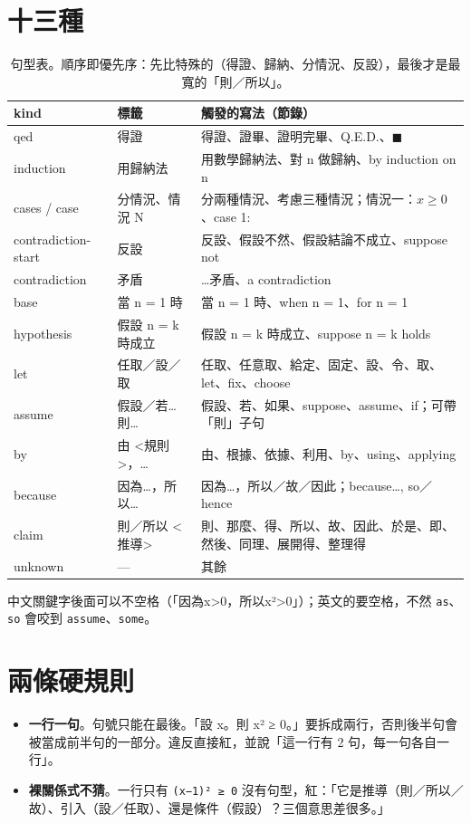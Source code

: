 \documentclass[11pt,a4paper,oneside]{book}
\renewcommand{\_}{\ifmmode\origunderscore\else\textunderscore\allowbreak\fi}
\newcommand{\code}[1]{\texttt{#1}}
\begin{document}
\section{十三種}
\begin{table}[h]
\centering\small\sffamily
\begin{tabularx}{\textwidth}{@{}llY@{}}
\toprule
kind & 標籤 & 觸發的寫法（節錄） \\
\midrule
qed & 得證 & 得證、證畢、證明完畢、Q.E.D.、$\blacksquare$ \\
induction & 用歸納法 & 用數學歸納法、對 n 做歸納、by induction on n \\
cases / case & 分情況、情況 N & 分兩種情況、考慮三種情況；情況一：$x \ge 0$、case 1: \\
contradiction-start & 反設 & 反設、假設不然、假設結論不成立、suppose not \\
contradiction & 矛盾 & …矛盾、a contradiction \\
base & 當 n = 1 時 & 當 n = 1 時、when n = 1、for n = 1 \\
hypothesis & 假設 n = k 時成立 & 假設 n = k 時成立、suppose n = k holds \\
let & 任取／設／取 & 任取、任意取、給定、固定、設、令、取、let、fix、choose \\
assume & 假設／若…則… & 假設、若、如果、suppose、assume、if；可帶「則」子句 \\
by & 由 <規則>，… & 由、根據、依據、利用、by、using、applying \\
because & 因為…，所以… & 因為…，所以／故／因此；because…, so／hence \\
claim & 則／所以 <推導> & 則、那麼、得、所以、故、因此、於是、即、然後、同理、展開得、整理得 \\
unknown & — & 其餘 \\
\bottomrule
\end{tabularx}
\caption{句型表。順序即優先序：先比特殊的（得證、歸納、分情況、反設），最後才是最寬的「則／所以」。}
\end{table}

中文關鍵字後面可以不空格（「因為x>0，所以x²>0」）；英文的要空格，不然 \code{as}、\code{so} 會咬到 \code{assume}、\code{some}。

\section{兩條硬規則}
\begin{itemize}
  \item \textbf{一行一句}。句號只能在最後。「設 x。則 x² ≥ 0。」要拆成兩行，否則後半句會被當成前半句的一部分。違反直接紅，並說「這一行有 2 句，每一句各自一行」。
  \item \textbf{裸關係式不猜}。一行只有 \code{(x−1)² ≥ 0} 沒有句型，紅：「它是推導（則／所以／故）、引入（設／任取）、還是條件（假設）？三個意思差很多。」
\end{itemize}
\end{document}
